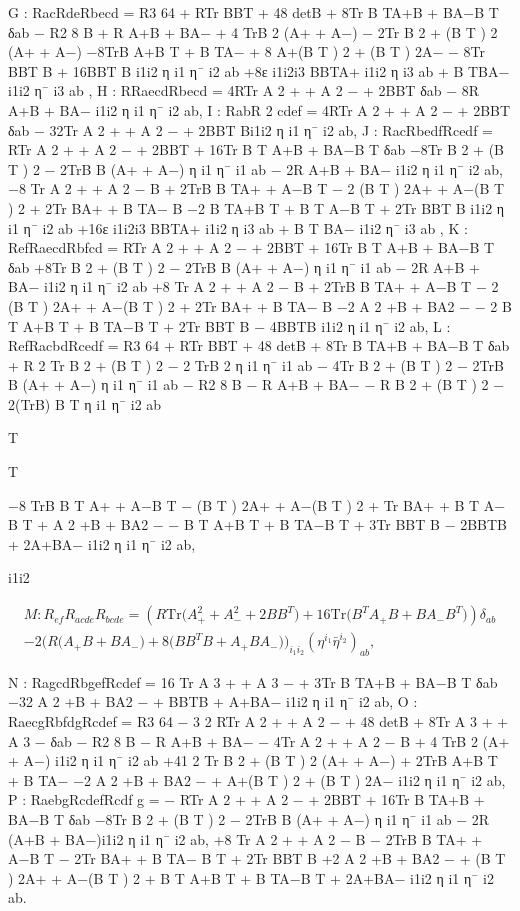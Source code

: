 \documentclass{article}
\begin{document}
G : RacRdeRbecd = R3 64 + RTr BBT + 48 detB + 8Tr B TA+B + BA−B T δab − R2 8 B + R A+B + BA− + 4 TrB 2 (A+ + A−) − 2Tr B 2 + (B T ) 2 (A+ + A−) −8TrB A+B T + B TA− + 8 A+(B T ) 2 + (B T ) 2A− − 8Tr BBT B + 16BBT B i1i2 η i1 η¯ i2 ab +8ε i1i2i3 BBTA+ i1i2 η i3 ab + B TBA− i1i2 η¯ i3 ab , H : RRaecdRbecd = 4RTr A 2 + + A 2 − + 2BBT δab − 8R A+B + BA− i1i2 η i1 η¯ i2 ab, I : RabR 2 cdef = 4RTr A 2 + + A 2 − + 2BBT δab − 32Tr A 2 + + A 2 − + 2BBT Bi1i2 η i1 η¯ i2 ab, J : RacRbedfRcedf = RTr A 2 + + A 2 − + 2BBT + 16Tr B T A+B + BA−B T δab −8Tr B 2 + (B T ) 2 − 2TrB B (A+ + A−) η i1 η¯ i1 ab − 2R A+B + BA− i1i2 η i1 η¯ i2 ab, −8 Tr A 2 + + A 2 − B + 2TrB B TA+ + A−B T − 2 (B T ) 2A+ + A−(B T ) 2 + 2Tr BA+ + B TA− B −2 B TA+B T + B T A−B T + 2Tr BBT B i1i2 η i1 η¯ i2 ab +16ε i1i2i3 BBTA+ i1i2 η i3 ab + B T BA− i1i2 η¯ i3 ab , K : RefRaecdRbfcd = RTr A 2 + + A 2 − + 2BBT + 16Tr B T A+B + BA−B T δab +8Tr B 2 + (B T ) 2 − 2TrB B (A+ + A−) η i1 η¯ i1 ab − 2R A+B + BA− i1i2 η i1 η¯ i2 ab +8 Tr A 2 + + A 2 − B + 2TrB B TA+ + A−B T − 2 (B T ) 2A+ + A−(B T ) 2 + 2Tr BA+ + B TA− B −2 A 2 +B + BA2 − − 2 B T A+B T + B TA−B T + 2Tr BBT B − 4BBTB i1i2 η i1 η¯ i2 ab, L : RefRacbdRcedf = R3 64 + RTr BBT + 48 detB + 8Tr B TA+B + BA−B T δab + R 2 Tr B 2 + (B T ) 2 − 2 TrB 2 η i1 η¯ i1 ab − 4Tr B 2 + (B T ) 2 − 2TrB B (A+ + A−) η i1 η¯ i1 ab − R2 8 B − R A+B + BA− − R B 2 + (B T ) 2 − 2(TrB) B T η i1 η¯ i2 ab

T

T

−8 TrB B T A+ + A−B T − (B T ) 2A+ + A−(B T ) 2 + Tr BA+ + B T A− B T + A 2 +B + BA2 − − B T A+B T + B TA−B T + 3Tr BBT B − 2BBTB + 2A+BA− i1i2 η i1 η¯ i2 ab,

i1i2

$$\begin{array}{c}{{M:R_{e f}R_{a c d e}R_{b c d e}=\left(R\mathrm{Tr}\big(A_{+}^{2}+A_{-}^{2}+2B B^{T}\big)+16\mathrm{Tr}\big(B^{T}A_{+}B+B A_{-}B^{T}\big)\right)\delta_{a b}}}\\ {{-2\Big(R\big(A_{+}B+B A_{-}\big)+8\big(B B^{T}B+A_{+}B A_{-}\big)\Big)_{i_{1}i_{2}}\left(\eta^{i_{1}}\bar{\eta}^{i_{2}}\right)_{a b},}}\end{array}$$

N : RagcdRbgefRcdef = 16 Tr A 3 + + A 3 − + 3Tr B TA+B + BA−B T δab −32 A 2 +B + BA2 − + BBTB + A+BA− i1i2 η i1 η¯ i2 ab, O : RaecgRbfdgRcdef = R3 64 − 3 2 RTr A 2 + + A 2 − + 48 detB + 8Tr A 3 + + A 3 − δab − R2 8 B − R A+B + BA− − 4Tr A 2 + + A 2 − B + 4 TrB 2 (A+ + A−) i1i2 η i1 η¯ i2 ab +41 2 Tr B 2 + (B T ) 2 (A+ + A−) + 2TrB A+B T + B TA− −2 A 2 +B + BA2 − + A+(B T ) 2 + (B T ) 2A− i1i2 η i1 η¯ i2 ab, P : RaebgRcdefRcdf g = − RTr A 2 + + A 2 − + 2BBT + 16Tr B TA+B + BA−B T δab −8Tr B 2 + (B T ) 2 − 2TrB B (A+ + A−) η i1 η¯ i1 ab − 2R (A+B + BA−)i1i2 η i1 η¯ i2 ab, +8 Tr A 2 + + A 2 − B − 2TrB B TA+ + A−B T − 2Tr BA+ + B TA− B T + 2Tr BBT B +2 A 2 +B + BA2 − + (B T ) 2A+ + A−(B T ) 2 + B T A+B T + B TA−B T + 2A+BA− i1i2 η i1 η¯ i2 ab.
\end{document}
